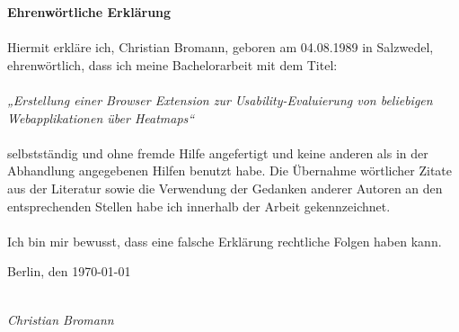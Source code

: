 \documentclass[
	bibliography=totoc,
	listof=totoc,							%
	BCOR=5mm,							%
	DIV=12]{scrbook}
\begin{document}
\vspace*{1cm}

\noindent
{\Huge \textbf{Ehrenwörtliche Erklärung}}\\
\\
Hiermit erkläre ich, Christian Bromann, geboren am 04.08.1989 in Salzwedel, ehrenwörtlich, dass ich meine Bachelorarbeit mit dem Titel:\\
\\
\textit{„Erstellung einer Browser Extension zur Usability-Evaluierung von beliebigen Webapplikationen über Heatmaps“}\\
\\
selbstständig und ohne fremde Hilfe angefertigt und keine anderen als in der Abhandlung angegebenen Hilfen benutzt habe.
Die Übernahme wörtlicher Zitate aus der Literatur sowie die Verwendung der Gedanken anderer Autoren an den entsprechenden Stellen habe ich innerhalb der Arbeit gekennzeichnet.\\
\\
Ich bin mir bewusst, dass eine falsche Erklärung rechtliche Folgen haben kann.

\vspace{2cm}

\noindent
Berlin, den \today

\vspace{3cm}

\hspace*{7cm}%
\dotfill\\
\hspace*{9.5cm}%
\textit{Christian Bromann}
\end{document}
